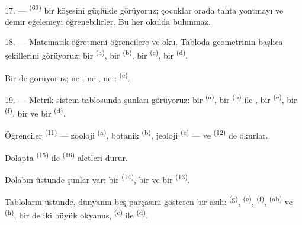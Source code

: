 17. ---  \textsuperscript{(69)}  bir
köşesini güçlükle görüyoruz; çocuklar orada tahta yontmayı ve demir eğelemeyi
öğrenebilirler. Bu her okulda bulunmaz.

\VUsaut{5.0mm}
\VUsaut{3.6mm}

18. --- Matematik öğretmeni öğrencilere  ve
 oku. Tabloda geometrinin başlıca şekillerini
görüyoruz: bir  \textsuperscript{(a)}, bir 
\textsuperscript{(b)}, bir  \textsuperscript{(c)}, bir
 \textsuperscript{(d)}.

Bir de  görüyoruz; ne , ne
, ne : 
\textsuperscript{(e)}.

19. --- Metrik sistem tablosunda şunları görüyoruz: bir 
\textsuperscript{(a)}, bir  \textsuperscript{(b)} ile
, bir  \textsuperscript{(e)}, bir
 \textsuperscript{(f)}, bir  ve bir
 \textsuperscript{(d)}.

Öğrenciler  \textsuperscript{(11)} --- zooloji
\textsuperscript{(a)}, botanik \textsuperscript{(b)}, jeoloji
\textsuperscript{(c)} --- ve  \textsuperscript{(12)} de okurlar.

Dolapta  \textsuperscript{(15)} ile 
\textsuperscript{(16)} aletleri durur.

Dolabın üstünde şunlar var: bir  \textsuperscript{(14)}, bir
 ve bir  \textsuperscript{(13)}.

Tabloların üstünde, dünyanın beş parçasını gösteren bir 
asılı:  \textsuperscript{(g)}, 
\textsuperscript{(e)},  \textsuperscript{(f)},
 \textsuperscript{(ab)} ve 
\textsuperscript{(h)}, bir de iki büyük okyanus, 
\textsuperscript{(c)} ile  \textsuperscript{(d)}.
\VUsaut{6.0mm}
\VUfilet{22mm}
